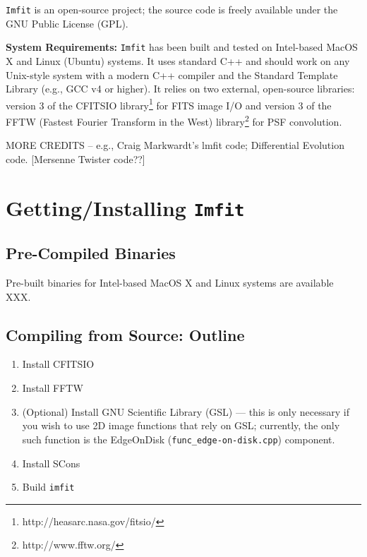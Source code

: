 \documentclass[10pt]{article}
\newcommand{\imfit}{\texttt{imfit}}
\newcommand{\Imfit}{\texttt{Imfit}}
\begin{document}
\Imfit{} is an open-source project; the source code is freely available
under the GNU Public License (GPL).


\bigskip

\textbf{System Requirements:} \Imfit{} has been built and tested on
Intel-based MacOS X and Linux (Ubuntu) systems. It uses standard C++ and
should work on any Unix-style system with a modern C++ compiler and the
Standard Template Library (e.g., GCC v4 or higher). It relies on two
external, open-source libraries: version 3 of the CFITSIO
library\footnote{http://heasarc.nasa.gov/fitsio/} for FITS image I/O and
version 3 of the FFTW (Fastest Fourier Transform in the West)
library\footnote{http://www.fftw.org/} for PSF convolution.

MORE CREDITS -- e.g., Craig Markwardt's lmfit code; Differential Evolution
code.  [Mersenne Twister code??]



\section{Getting/Installing \Imfit{}}

\subsection{Pre-Compiled Binaries}

Pre-built binaries for Intel-based MacOS X and Linux systems are available XXX.


\subsection{Compiling from Source: Outline}

\begin{enumerate}
\item Install CFITSIO

\item Install FFTW

\item (Optional) Install GNU Scientific Library (GSL) --- this is only necessary
if you wish to use 2D image functions that rely on GSL; currently, the only
such function is the EdgeOnDisk (\texttt{func\_edge-on-disk.cpp}) component.

\item Install SCons

\item Build \imfit{}

\end{enumerate}
\end{document}
